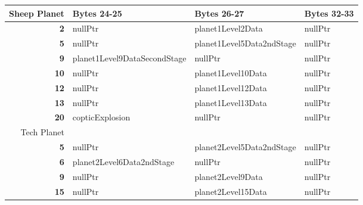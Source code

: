 \begin{figure}[H]
  {
  \setlength{\tabcolsep}{3.0pt}
  \setlength\cmidrulewidth{\heavyrulewidth} %
  \begin{adjustbox}{width=\textwidth}

\begin{tabular}{rlll}
\toprule
   Sheep Planet & Bytes 24-25                      & Bytes 26-27                   & Bytes 32-33   \\
\midrule
       \textbf{2} & nullPtr\index{nullPtr}                      & planet1Level2Data\index{planet1Level2Data}         & nullPtr\index{nullPtr}       \\
       \textbf{5} & nullPtr\index{nullPtr}                      & planet1Level5Data2ndStage\index{planet1Level5Data2ndStage} & nullPtr\index{nullPtr}       \\
       \textbf{9} & planet1Level9DataSecondStage\index{planet1Level9DataSecondStage} & nullPtr\index{nullPtr}                   & nullPtr\index{nullPtr}       \\
      \textbf{10} & nullPtr\index{nullPtr}                      & planet1Level10Data\index{planet1Level10Data}        & nullPtr\index{nullPtr}       \\
      \textbf{12} & nullPtr\index{nullPtr}                      & planet1Level12Data\index{planet1Level12Data}        & nullPtr\index{nullPtr}       \\
      \textbf{13} & nullPtr\index{nullPtr}                      & planet1Level13Data\index{planet1Level13Data}        & nullPtr\index{nullPtr}       \\
      \textbf{20} & copticExplosion\index{copticExplosion}              & nullPtr\index{nullPtr}                   & nullPtr\index{nullPtr}       \\
\toprule
   Tech Planet \\
\midrule
       \textbf{5} & nullPtr\index{nullPtr}                   & planet2Level5Data2ndStage\index{planet2Level5Data2ndStage} & nullPtr\index{nullPtr}       \\
       \textbf{6} & planet2Level6Data2ndStage\index{planet2Level6Data2ndStage} & nullPtr\index{nullPtr}                   & nullPtr\index{nullPtr}       \\
       \textbf{9} & nullPtr\index{nullPtr}                   & planet2Level9Data\index{planet2Level9Data}         & nullPtr\index{nullPtr}       \\
      \textbf{15} & nullPtr\index{nullPtr}                   & planet2Level15Data\index{planet2Level15Data}        & nullPtr\index{nullPtr}       \\

\end{tabular}
\end{adjustbox}}
\end{figure}
